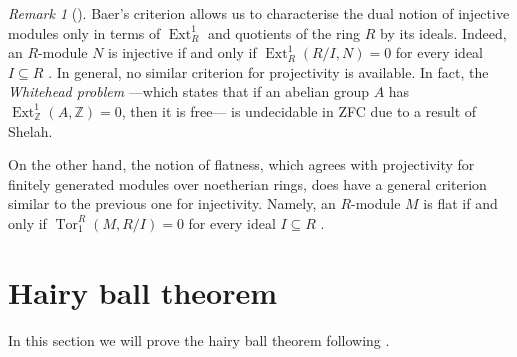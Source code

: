 \documentclass[A4paper, 12pt, british, reqno]{amsart}
\newcommand{\Z}{\mathbb{Z}} %
\theoremstyle{plain}
\theoremstyle{definition}
\theoremstyle{remark}
\newtheorem{rem}[thm]{Remark}
\theoremstyle{plain}
\theoremstyle{definition}
\theoremstyle{remark}
\theoremstyle{plain}
\theoremstyle{definition}
\theoremstyle{remark}
\DeclareMathOperator{\Ext}{Ext}
\DeclareMathOperator{\Tor}{Tor}
\begin{document}
{\color{gray}
\begin{rem}[{\cite{fra18}}]
    Baer's criterion \cite[Prop.~1.1.1]{fra18} allows us to characterise the dual notion of injective modules only in terms of $\Ext^{1}_{R}$ and quotients of the ring $R$ by its ideals.
    Indeed, an $R$-module $N$ is injective if and only if $\Ext^{1}_{R}(R/I,N)=0$ for every ideal $I\subseteq R$ \cite[Prop.~1.1.4]{fra18}.
    In general, no similar criterion for projectivity is available.
    In fact, the \textit{Whitehead problem} ---which states that if an abelian group $A$ has $\Ext^{1}_{\Z}(A,\Z)=0$, then it is free--- is undecidable in ZFC due to a result of Shelah.

    On the other hand, the notion of flatness, which agrees with projectivity for finitely generated modules over noetherian rings, does have a general criterion similar to the previous one for injectivity.
    Namely, an $R$-module $M$ is flat if and only if $\Tor_{1}^{R}(M,R/I)=0$ for every ideal $I\subseteq R$ \cite[Prop.~1.2.3]{fra18}.
\end{rem}
}

\section{Hairy ball theorem}

In this section we will prove the hairy ball theorem following \cite{eg79}.
\end{document}
